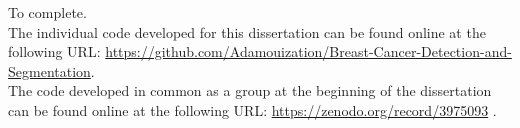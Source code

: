 To complete.\\

The individual code developed for this dissertation can be found online at the following URL: \url{https://github.com/Adamouization/Breast-Cancer-Detection-and-Segmentation}.\\

The code developed in common as a group at the beginning of the dissertation can be found online at the following URL: \url{https://zenodo.org/record/3975093} \citep{adam_jaamour_2020_3975093}.